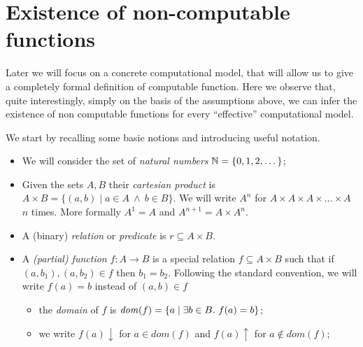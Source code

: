 \section{Existence of non-computable functions}

Later we will focus on a concrete computational model, that will allow
us to give a completely formal definition of computable function. Here
we observe that, quite interestingly, simply on the basis of the
assumptions above, we can infer the existence of non computable
functions for every ``effective'' computational model.

We start by recalling some basic notions and introducing useful
notation.

\begin{itemize}
\item We will consider the set of \emph{natural numbers}
  $\mathbb{N} = \{ 0, 1, 2, \dots \}$;

\item Given the sets $A, B$ their \emph{cartesian product} is
  $A \times B = \{ (a,b) \mid a \in A\ \land\ b \in B\}$. We will
  write $A^n$ for $A \times A \times A \times \ldots \times A$ $n$
  times. More formally $A^1 = A$ and $ A^{n+1} = A \times A^n$.
  
\item A (binary) \emph{relation} or \emph{predicate} is
  $r \subseteq A \times B$.
  
\item A \emph{(partial) function} $f : A \to B$ is a special relation $f \subseteq A\times B$ such that if $(a, b_1), (a, b_2) \in f$ then  $b_1 = b_2$.  Following the standard convention, we will write $f(a) = b$ instead
  of $(a, b)\in f$
  \begin{itemize}
  \item the \emph{domain} of $f$ is
    $\mathit{dom}({f}) = \{a \mid \exists b \in B.\ f(a) = b \}$;

  \item we write $f(a) \downarrow$ for $a \in dom (f)$ and
    $f(a) \uparrow$ for $a \not\in dom (f)$;
  \end{itemize}


\end{itemize}
